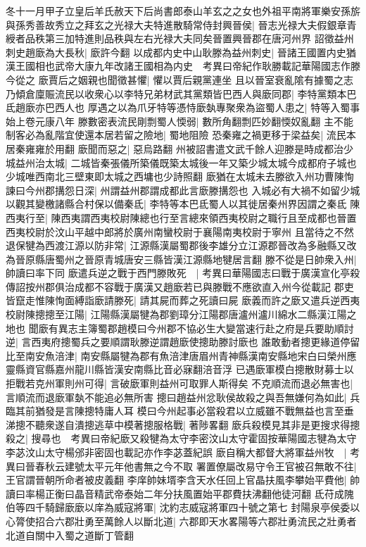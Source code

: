 冬十一月甲子立皇后羊氏赦天下后尚書郎泰山羊玄之之女也外祖平南將軍樂安孫旂與孫秀善故秀立之拜玄之光禄大夫特進散騎常侍封興晉侯|{
	晉志光禄大夫假銀章青綬者品秩第三加特進則品秩與左右光禄大夫同矣晉置興晉郡在唐河州界}
詔徵益州刺史趙廞為大長秋|{
	廞許今翻}
以成都内史中山耿滕為益州刺史|{
	晉諸王國置内史猶漢王國相也武帝大康九年改諸王國相為内史　考異曰帝紀作耿勝載記華陽國志作滕今從之}
廞賈后之姻親也聞徵甚懼|{
	懼以賈后親黨連坐}
且以晉室衰亂隂有據蜀之志乃傾倉廩賑流民以收衆心以李特兄弟材武其黨類皆巴西人與廞同郡|{
	李特黨類本巴氐趙廞亦巴西人也}
厚遇之以為爪牙特等憑恃廞埶專聚衆為盜蜀人患之|{
	特等入蜀事始上卷元康八年}
滕數密表流民剛剽蜀人愞弱|{
	數所角翻剽匹妙翻愞奴亂翻}
主不能制客必為亂階宜使還本居若留之險地|{
	蜀地阻險}
恐秦雍之禍更移于梁益矣|{
	流民本居秦雍雍於用翻}
廞聞而惡之|{
	惡烏路翻}
州被詔書遣文武千餘人迎滕是時成都治少城益州治太城|{
	二城皆秦張儀所築儀既築太城後一年又築少城太城今成都府子城也少城唯西南北三壁東即太城之西墉也少詩照翻}
廞猶在太城未去滕欲入州功曹陳恂諫曰今州郡搆怨日深|{
	州謂益州郡謂成都此言廞滕搆怨也}
入城必有大禍不如留少城以觀其變檄諸縣合村保以備秦氐|{
	李特等本巴氐蜀人以其徙居秦州界因謂之秦氐}
陳西夷行至|{
	陳西夷謂西夷校尉陳總也行至言總來領西夷校尉之職行且至成都也晉置西夷校尉於汶山平越中郎將於廣州南蠻校尉于襄陽南夷校尉于寧州}
且當待之不然退保犍為西渡江源以防非常|{
	江源縣漢屬蜀郡後李雄分立江源郡晉改為多融縣又改為晉原縣唐蜀州之晉原青城唐安三縣皆漢江源縣地犍居言翻}
滕不從是日帥衆入州|{
	帥讀曰率下同}
廞遣兵逆之戰于西門滕敗死　|{
	考異曰華陽國志曰戰于廣漢宣化亭殺傳詔按州郡俱治成都不容戰于廣漢又趙廞若已與滕戰不應欲直入州今從載記}
郡吏皆竄走惟陳恂面縛詣廞請滕死|{
	請其屍而葬之死讀曰屍}
廞義而許之廞又遣兵逆西夷校尉陳摠摠至江陽|{
	江陽縣漢屬犍為郡劉璋分江陽郡唐瀘州瀘川綿水二縣漢江陽之地也}
聞廞有異志主簿蜀郡趙模曰今州郡不協必生大變當速行赴之府是兵要助順討逆|{
	言西夷府摠蜀兵之要順謂耿滕逆謂趙廞使摠助滕討廞也}
誰敢動者摠更緣道停留比至南安魚涪津|{
	南安縣屬犍為郡有魚涪津唐眉州青神縣漢南安縣地宋白曰榮州應靈縣資官縣嘉州龍川縣皆漢安南縣比音必寐翻涪音浮}
已遇廞軍模白摠散財募士以拒戰若克州軍則州可得|{
	言破廞軍則益州可取罪人斯得矣}
不克順流而退必無害也|{
	言順流而退廞軍埶不能追必無所害}
摠曰趙益州忿耿侯故殺之與吾無嫌何為如此|{
	兵臨其前猶發是言陳摠特庸人耳}
模曰今州起事必當殺君以立威雖不戰無益也言至垂涕摠不聽衆遂自潰摠逃草中模著摠服格戰|{
	著陟畧翻}
廞兵殺模見其非是更搜求得摠殺之|{
	搜尋也　考異曰帝紀廞又殺犍為太守李密汶山太守霍固按華陽國志犍為太守李苾汶山太守楊邠非密固也載記亦作李苾蓋紀誤}
廞自稱大都督大將軍益州牧　|{
	考異曰晉春秋云建號太平元年他書無之今不取}
署置僚屬改易守令王官被召無敢不往|{
	王官謂晉朝所命者被皮義翻}
李庠帥妹壻李含天水任回上官晶扶風李攀始平費他|{
	帥讀曰率楊正衡曰晶音精武帝泰始二年分扶風置始平郡費扶沸翻他徒河翻}
氐苻成隗伯等四千騎歸廞廞以庠為威寇將軍|{
	沈約志威寇將軍四十號之第七}
封陽泉亭侯委以心膂使招合六郡壯勇至萬餘人以斷北道|{
	六郡即天水畧陽等六郡壯勇流民之壯勇者北道自關中入蜀之道斷丁管翻}


